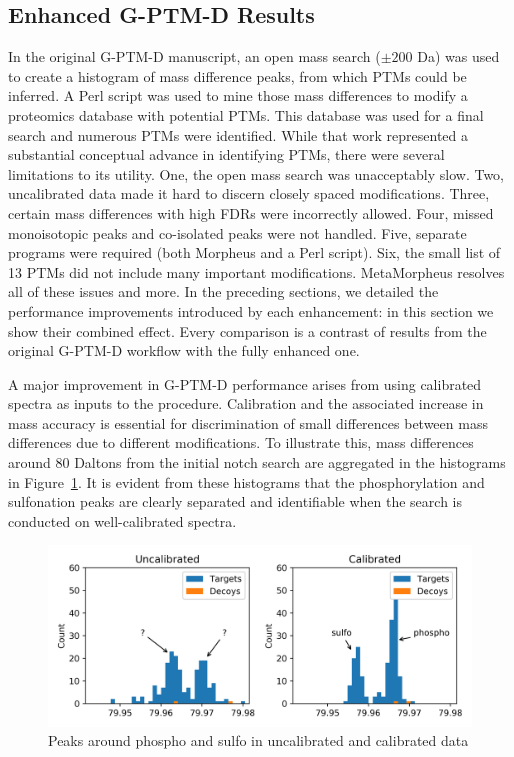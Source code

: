\documentclass[journal=jprobs,manuscript=article]{achemso}
\begin{document}
\subsection{Enhanced G-PTM-D Results}

In the original G-PTM-D manuscript\citep{Li_2016}, an open mass search ($\pm 200$ Da) was used to create a histogram of mass difference peaks, from which PTMs could be inferred.
A Perl script was used to mine those mass differences to modify a proteomics database with potential PTMs.
This database was used for a final search and numerous PTMs were identified.
While that work represented a substantial conceptual advance in identifying PTMs, there were several limitations to its utility.
One, the open mass search was unacceptably slow.
Two, uncalibrated data made it hard to discern closely spaced modifications.
Three, certain mass differences with high FDRs were incorrectly allowed.
Four, missed monoisotopic peaks and co-isolated peaks were not handled.
Five, separate programs were required (both Morpheus and a Perl script).
Six, the small list of 13 PTMs did not include many important modifications.
MetaMorpheus resolves all of these issues and more.
In the preceding sections, we detailed the performance improvements introduced by each enhancement: in this section we show their combined effect.
Every comparison is a contrast of results from the original G-PTM-D workflow with the fully enhanced one.

A major improvement in G-PTM-D performance arises from using calibrated spectra as inputs to the procedure.
Calibration and the associated increase in mass accuracy is essential for discrimination of small differences between mass differences due to different modifications.
To illustrate this, mass differences around 80 Daltons from the initial notch search are aggregated in the histograms in Figure~\ref{fig:fig7-PhosphoAndSulfo}.
It is evident from these histograms that the phosphorylation and sulfonation peaks are clearly separated and identifiable when the search is conducted on well-calibrated spectra.


\begin{figure}[H]
\includegraphics{fig7-SulfoAndPhospho.png}
\caption{Peaks around phospho and sulfo in uncalibrated and calibrated data}
\label{fig:fig7-PhosphoAndSulfo}
\end{figure}
\end{document}
